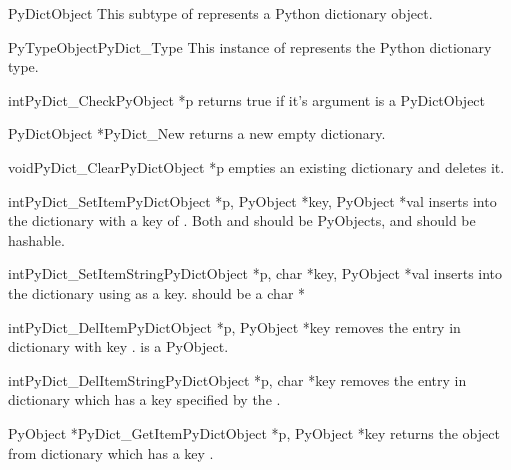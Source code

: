 \documentclass[twoside,openright]{report}
\begin{document}
\begin{ctypedesc}{PyDictObject}
This subtype of  represents a Python dictionary object.
\end{ctypedesc}

\begin{cvardesc}{PyTypeObject}{PyDict_Type}
This instance of  represents the Python dictionary type.
\end{cvardesc}

\begin{cfuncdesc}{int}{PyDict_Check}{PyObject *p}
returns true if it's argument is a PyDictObject
\end{cfuncdesc}

\begin{cfuncdesc}{PyDictObject *}{PyDict_New}{}
returns a new empty dictionary.
\end{cfuncdesc}

\begin{cfuncdesc}{void}{PyDict_Clear}{PyDictObject *p}
empties an existing dictionary and deletes it.
\end{cfuncdesc}

\begin{cfuncdesc}{int}{PyDict_SetItem}{PyDictObject *p,
            PyObject *key,
            PyObject *val}
inserts  into the dictionary with a key of
. Both  and  should be PyObjects, and  should
be hashable.
\end{cfuncdesc}

\begin{cfuncdesc}{int}{PyDict_SetItemString}{PyDictObject *p,
            char *key,
            PyObject *val}
inserts  into the dictionary using 
as a key.  should be a char *
\end{cfuncdesc}

\begin{cfuncdesc}{int}{PyDict_DelItem}{PyDictObject *p, PyObject *key}
removes the entry in dictionary  with key .
 is a PyObject.
\end{cfuncdesc}

\begin{cfuncdesc}{int}{PyDict_DelItemString}{PyDictObject *p, char *key}
removes the entry in dictionary  which has a key
specified by the .
\end{cfuncdesc}

\begin{cfuncdesc}{PyObject *}{PyDict_GetItem}{PyDictObject *p, PyObject *key}
returns the object from dictionary  which has a key
.
\end{cfuncdesc}
\end{document}
